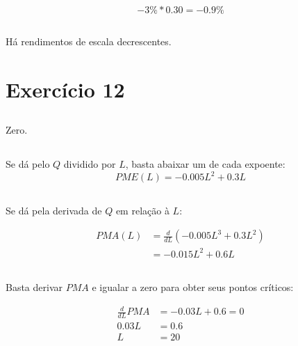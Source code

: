\documentclass{article}
\begin{document}
\subsection{}
\[
	-3\% * 0.30 = -0.9\%
\]

\subsection{}

Há rendimentos de escala decrescentes.

\section{Exercício 12}

\subsection{}

Zero.

\subsection{}

Se dá pelo \(Q\) dividido por \(L\), basta abaixar um de cada expoente:
\[
	PME(L) = -0.005L^2 + 0.3L
\]

\subsection{}

Se dá pela derivada de \(Q\) em relação à \(L\):

\[
	\begin{aligned}
		PMA(L) & = \frac{d}{dL}(-0.005L^3 + 0.3L^2) \\
		       & = -0.015L^2 + 0.6L
	\end{aligned}
\]


\subsection{}

Basta derivar \(PMA\) e igualar a zero para obter seus pontos críticos:

\[
	\begin{aligned}
		\frac{d}{dL}PMA & = - 0.03L + 0.6 = 0 \\
		0.03L           & = 0.6               \\
		L               & = 20
	\end{aligned}
\]
\end{document}
